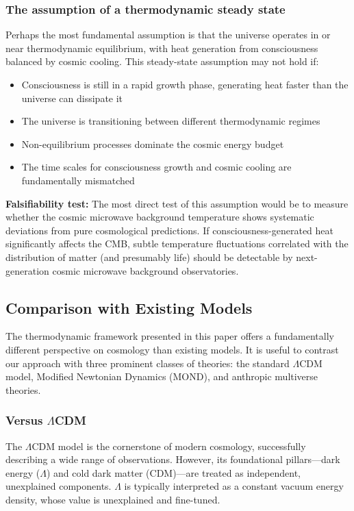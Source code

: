 \documentclass[11pt,a4paper]{article}
\theoremstyle{definition}
\theoremstyle{remark}
\begin{document}
\subsubsection{The assumption of a thermodynamic steady state}

Perhaps the most fundamental assumption is that the universe operates in or near thermodynamic equilibrium, with heat generation from consciousness balanced by cosmic cooling. This steady-state assumption may not hold if:

\begin{itemize}
    \item Consciousness is still in a rapid growth phase, generating heat faster than the universe can dissipate it
    \item The universe is transitioning between different thermodynamic regimes
    \item Non-equilibrium processes dominate the cosmic energy budget
    \item The time scales for consciousness growth and cosmic cooling are fundamentally mismatched
\end{itemize}

\textbf{Falsifiability test:} The most direct test of this assumption would be to measure whether the cosmic microwave background temperature shows systematic deviations from pure cosmological predictions. If consciousness-generated heat significantly affects the CMB, subtle temperature fluctuations correlated with the distribution of matter (and presumably life) should be detectable by next-generation cosmic microwave background observatories.

\subsection{Comparison with Existing Models}

The thermodynamic framework presented in this paper offers a fundamentally different perspective on cosmology than existing models. It is useful to contrast our approach with three prominent classes of theories: the standard \(\Lambda\)CDM model, Modified Newtonian Dynamics (MOND), and anthropic multiverse theories.

\subsubsection{Versus \(\Lambda\)CDM}
The \(\Lambda\)CDM model is the cornerstone of modern cosmology, successfully describing a wide range of observations. However, its foundational pillars—dark energy (\(\Lambda\)) and cold dark matter (CDM)—are treated as independent, unexplained components. \(\Lambda\) is typically interpreted as a constant vacuum energy density, whose value is unexplained and fine-tuned.
\end{document}
